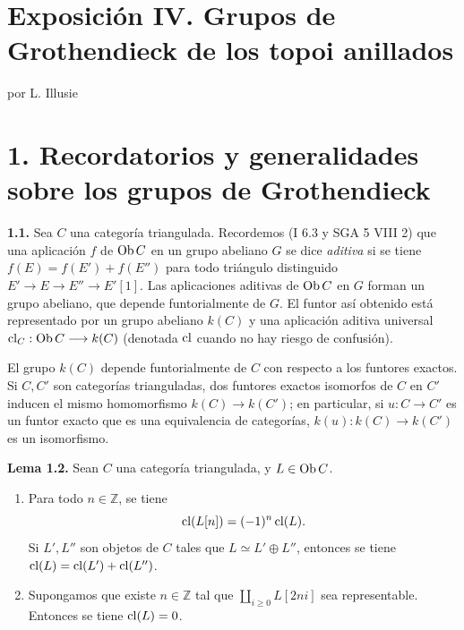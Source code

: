 \providecommand{\sisi}[2]{#2}

\section*{Exposición IV. Grupos de Grothendieck de los topoi anillados}
\begin{center}
por L. Illusie
\end{center}

\section*{1. Recordatorios y generalidades sobre los grupos de Grothendieck}

\textbf{1.1.} Sea \(C\) una categoría triangulada. Recordemos (I 6.3 y SGA 5 VIII 2) que una aplicación \(f\) de \(\operatorname{Ob} C\) en un grupo abeliano \(G\) se dice \emph{aditiva} si se tiene \(f(E)=f(E')+f(E'')\) para todo triángulo distinguido \(E'\longrightarrow E\longrightarrow E''\longrightarrow E'[1]\). Las aplicaciones aditivas de \(\operatorname{Ob} C\) en \(G\) forman un grupo abeliano, que depende funtorialmente de \(G\). El funtor así obtenido está representado por un grupo abeliano \(k(C)\) y una aplicación aditiva universal \(\operatorname{cl}_C:\operatorname{Ob} C\longrightarrow k(C)\) (denotada \(\operatorname{cl}\) cuando no hay riesgo de confusión).

El grupo \(k(C)\) depende funtorialmente de \(C\) con respecto a los funtores exactos. Si \(C,C'\) son categorías trianguladas, dos funtores exactos isomorfos de \(C\) en \(C'\) inducen el mismo homomorfismo \(k(C)\to k(C')\); en particular, si \(u:C\to C'\) es un funtor exacto que es una equivalencia de categorías, \(k(u):k(C)\to k(C')\) es un isomorfismo.

\textbf{Lema 1.2.} Sean \(C\) una categoría triangulada, y \(L\in\operatorname{Ob} C\).
\begin{enumerate}[label=\alph*)]
\item Para todo \(n\in\mathbb Z\), se tiene
\[
 \operatorname{cl}(L[n])=(-1)^n\operatorname{cl}(L).
\]
Si \(L',L''\) son objetos de \(C\) tales que \(L\simeq L'\oplus L''\), entonces se tiene \(\operatorname{cl}(L)=\operatorname{cl}(L')+\operatorname{cl}(L'')\).
\item Supongamos que existe \(n\in\mathbb Z\) tal que \(\coprod_{i\geq0} L[2ni]\) sea representable. Entonces se tiene \(\operatorname{cl}(L)=0\).
\end{enumerate}

